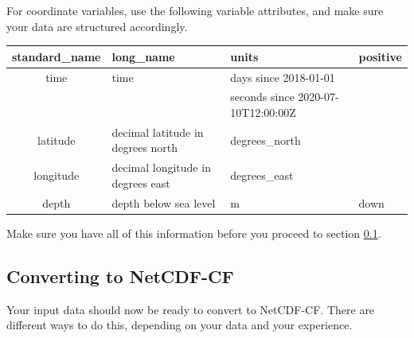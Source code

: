 \documentclass[a4paper,english, 11pt]{article}
\begin{document}
For coordinate variables, use the following variable attributes, and make sure your data are structured accordingly.

\begin{center}
\begin{tabular}{ |c|p{}|p{}|p{}| } 
\hline
standard\_name & long\_name & units & positive \\
\hline
time & time & days since 2018-01-01 & \\
& & seconds since 2020-07-10T12:00:00Z & \\ 
latitude & decimal latitude in degrees north & degrees\_north & \\
longitude & decimal longitude in degrees east & degrees\_east & \\
depth & depth below sea level & m & down \\
\hline
\end{tabular}
\end{center}

Make sure you have all of this information before you proceed to section \ref{ss:convertingnetcdf}.

\newpage
\subsection{Converting to NetCDF-CF}
\label{ss:convertingnetcdf}

Your input data should now be ready to convert to NetCDF-CF. There are different ways to do this, depending on your data and your experience.
\end{document}
